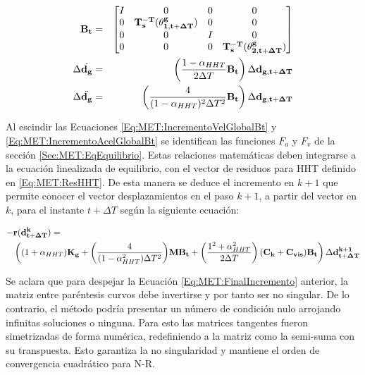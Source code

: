 \begin{eqnarray}
\label{Eq:MET:DefBt}
\bf{B}_t & = & \bf{\begin{bmatrix}
		I& 0 & 0 & 0\\ 
		0 & \bf{T_s^{-T}}(\bf{\theta^g_{1,{t+\Delta T}}}) & 0 & 0\\ 
		0& 0 & I & 0\\ 
		0 & 0 & 0 & \bf{T_s^{-T}}(\bf{\theta^g_{2,{t+\Delta T}}})
\end{bmatrix}}\\
\label{Eq:MET:IncrementoVelGlobalBt}
\Delta \dot{\bf{d_g}}&=& \left(\frac{1-\alpha_{HHT}}{2\Delta T} \bf{B_t}\right) \Delta
\bf{d_{g,{t+\Delta T}}}\\
\label{Eq:MET:IncrementoAcelGlobalBt}
\Delta \ddot{\bf{d_g}}&=& \left( \frac{4}{(1-\alpha_{HHT})^2 \Delta T^2} \bf{B_t} \right)\Delta
\bf{d_{g,{t+\Delta T}}}
\end{eqnarray}	



Al escindir las Ecuaciones \eqref{Eq:MET:IncrementoVelGlobalBt} y \eqref{Eq:MET:IncrementoAcelGlobalBt} se identifican las funciones $F_a$ y $F_v$ de la sección \ref{Sec:MET:EqEquilibrio}. Estas relaciones matemáticas deben integrarse a la ecuación linealizada de equilibrio, con el vector de residuos para HHT definido en   \eqref{Eq:MET:ResHHT}. De esta manera se deduce el incremento en $k+1$ que permite conocer el vector desplazamientos en el paso $k+1$, a partir del vector en $k$, para el instante $t+\Delta T$ según la siguiente ecuación: 

\begin{equation}\label{Eq:MET:FinalIncremento}
\begin{split}
	-&\bf{r}(\bf{d}^k_{t+\Delta T})=\\
	&\left((1+\alpha_{HHT})\bf{K}_g+\text{$\left( \frac{4}{(1-\alpha_{HHT}^2)\Delta T^2} \right)$} \bf{M}\bf{B}_t + \left(\text{$\frac{1^2+\alpha^2_{HHT}}{2\Delta T}$}\right) (\bf{C}_k+\bf{C}_{vis}) \bf{B}_t \right)\Delta\bf{d}^{k+1}_{t+\Delta T}
\end{split}
\end{equation}

Se aclara que para despejar la Ecuación \eqref{Eq:MET:FinalIncremento} anterior, la matriz entre paréntesis curvos debe invertirse y por tanto ser no singular. De lo contrario, el método podría presentar un número de condición nulo arrojando infinitas soluciones o ninguna. Para esto las matrices tangentes fueron simetrizadas de forma numérica, redefiniendo a la matriz como la semi-suma con su transpuesta. Esto garantiza la no singularidad y mantiene el orden de convergencia cuadrático para N-R.

